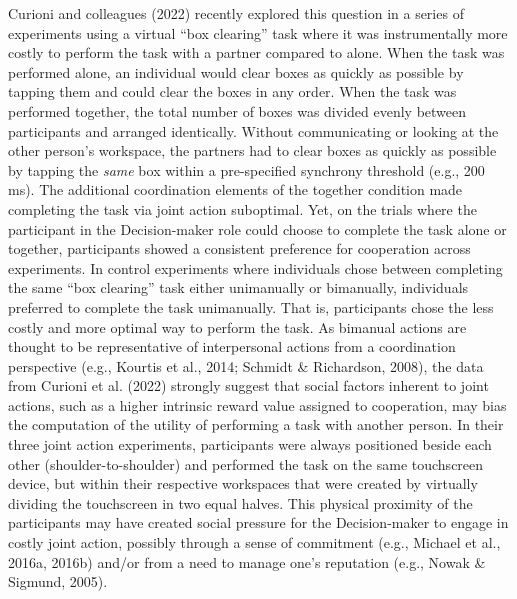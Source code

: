\documentclass[
  11pt,
  letterpaper,
]{article}
\renewcommand{\emph}[1]{\textit{#1}}  %
\begin{document}
Curioni and colleagues (2022) recently explored this question in a
series of experiments using a virtual ``box clearing'' task where it was
instrumentally more costly to perform the task with a partner compared
to alone. When the task was performed alone, an individual would clear
boxes as quickly as possible by tapping them and could clear the boxes
in any order. When the task was performed together, the total number of
boxes was divided evenly between participants and arranged identically.
Without communicating or looking at the other person's workspace, the
partners had to clear boxes as quickly as possible by tapping the
\emph{same} box within a pre-specified synchrony threshold (e.g., 200
ms). The additional coordination elements of the together condition made
completing the task via joint action suboptimal. Yet, on the trials
where the participant in the Decision-maker role could choose to
complete the task alone or together, participants showed a consistent
preference for cooperation across experiments. In control experiments
where individuals chose between completing the same ``box clearing''
task either unimanually or bimanually, individuals preferred to complete
the task unimanually. That is, participants chose the less costly and
more optimal way to perform the task. As bimanual actions are thought to
be representative of interpersonal actions from a coordination
perspective (e.g., Kourtis et al., 2014; Schmidt \& Richardson, 2008),
the data from Curioni et al. (2022) strongly suggest that social factors
inherent to joint actions, such as a higher intrinsic reward value
assigned to cooperation, may bias the computation of the utility of
performing a task with another person. In their three joint action
experiments, participants were always positioned beside each other
(shoulder-to-shoulder) and performed the task on the same touchscreen
device, but within their respective workspaces that were created by
virtually dividing the touchscreen in two equal halves. This physical
proximity of the participants may have created social pressure for the
Decision-maker to engage in costly joint action, possibly through a
sense of commitment (e.g., Michael et al., 2016a, 2016b) and/or from a
need to manage one's reputation (e.g., Nowak \& Sigmund, 2005).
\end{document}
